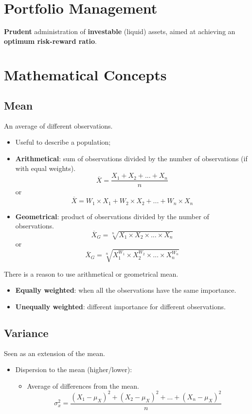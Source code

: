 \documentclass[11pt,a4paper]{report}
\begin{document}
\section{Portfolio Management}
\textbf{Prudent} administration of \textbf{investable} (liquid) assets, aimed at achieving an \textbf{optimum risk-reward ratio}.

\section{Mathematical Concepts}
\subsection{Mean} An average of different observations.
\begin{itemize}
    \item Useful to describe a population;
    \item \textbf{Arithmetical}: sum of observations divided by the number of observations (if with equal weights).
    \[\overline{X} = \frac{X_1 + X_2 + ... + X_n}{n}\]
    or
    \[\overline{X} = W_1 \times X_1 + W_2 \times X_2 + ... + W_n \times X_n\]
    \item \textbf{Geometrical}: product of observations divided by the number of observations.
    \[\overline{X}_G = \sqrt[n]{X_1 \times X_2 \times ... \times X_n}\]
    or
    \[\overline{X}_G = \sqrt[n]{X_1^{W_1} \times X_2^{W_2} \times ... \times X_n^{W_n}} \]
\end{itemize}
There is a reason to use arithmetical or geometrical mean.
\begin{itemize}
    \item \textbf{Equally weighted}: when all the observations have the same importance.
    \item \textbf{Unequally weighted}: different importance for different observations.
\end{itemize}

\subsection{Variance} Seen as an extension of the mean.
\begin{itemize}
    \item Dispersion to the mean (higher/lower):
    \begin{itemize}
        \item Average of differences from the mean.
        \[\sigma_x^2 = \frac{(X_1 - \mu_X)^2 + (X_2 - \mu_X)^2 + ... + (X_n - \mu_X)^2}{n}\]
    \end{itemize}
    
\end{itemize}
\end{document}
